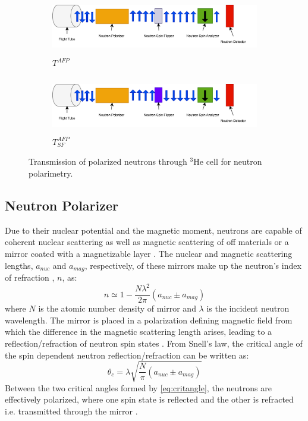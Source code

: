 {\begin{figure}
    \begin{subfigure}[b]{0.75\linewidth}
        \includegraphics[width=\linewidth, height=2.5cm]{figures/chapter4-figs/polbeam_afpcell.png}
    \caption{$T^{AFP}$}
    \label{fig:polbeam_afpcell}
    \end{subfigure}
    \hfil
    \begin{subfigure}[b]{0.75\linewidth}
        \includegraphics[width=\linewidth, height=2.5cm]{figures/chapter4-figs/sfbeam_afpcell.png}
    \caption{$T^{AFP}_{SF}$}
    \label{fig:sfbeam_afpcell}
    \end{subfigure}
\caption{Transmission of polarized neutrons through $^3$He cell for neutron polarimetry.}
\label{fig:pol_scheme}
\end{figure}
\clearpage}


\subsection{Neutron Polarizer}

Due to their nuclear potential and the magnetic moment, neutrons are capable of coherent nuclear scattering as well as magnetic scattering of off materials or a mirror coated with a magnetizable layer \cite{Hughes1951}. The nuclear and magnetic scattering lengths, $a_{nuc}$ and $a_{mag}$, respectively, of these mirrors make up the neutron’s index of refraction , $n$, as:
\begin{equation}
    n \simeq 1- \frac{N \lambda^2}{2 \pi} \left( a_{nuc} \pm a_{mag} \right)
\end{equation}
where $N$ is the atomic number density of mirror and $\lambda$ is the incident neutron wavelength. The mirror is placed in a polarization defining magnetic field from which the difference in the magnetic scattering length arises, leading to a reflection/refraction of neutron spin states \cite{Hughes1951, Scharpf1991}. From Snell's law, the critical angle of the spin dependent neutron reflection/refraction can be written as:
\begin{equation}
    \theta_c = \lambda \sqrt{  \frac{N}{\pi}  \left( a_{nuc} \pm a_{mag} \right) }
    \label{eq:critangle}
\end{equation}
Between the two critical angles formed by \cref{eq:critangle}, the neutrons are effectively polarized, where one spin state is reflected and the other is refracted i.e. transmitted through the mirror \cite{Hughes1951, Scharpf1991}. 

